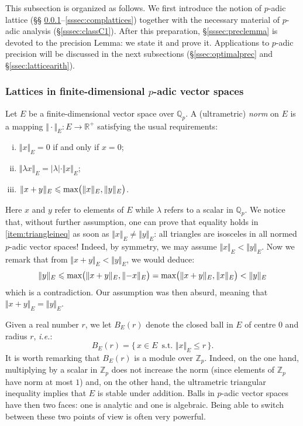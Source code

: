 \documentclass[11pt]{article}
\numberwithin{equation}{section}
\numberwithin{figure}{section}
\renewcommand{\leq}{\leqslant}
\theoremstyle{definition}
\newcommand{\Z}{\mathbb Z}
\newcommand{\Zp}{\Z_p}
\newcommand{\Q}{\mathbb Q}
\newcommand{\Qp}{\Q_p}
\newcommand{\R}{\mathbb R}
\renewcommand{\max}{\text{\rm max}}
\begin{document}
This subsection is organized as follows. We first introduce the notion 
of $p$-adic lattice (\S\S 
\ref{sssec:lattices}--\ref{sssec:complattices}) together with the 
necessary material of $p$-adic analysis (\S \ref{sssec:classC1}). After 
this preparation, \S \ref{sssec:preclemma} is devoted to the precision 
Lemma: we state it and prove it. Applications to $p$-adic precision 
will be discussed in the next subsections (\S \ref{ssec:optimalprec}
and \S \ref{ssec:latticearith}).

\subsubsection{Lattices in finite-dimensional $p$-adic vector spaces}
\label{sssec:lattices}

Let $E$ be a finite-dimensional vector space over $\Qp$.
A (ultrametric) \emph{norm} on $E$ is a mapping $\Vert \cdot \Vert_E :
E \to \R^+$ satisfying the usual requirements:
\begin{enumerate}[(i)]
\renewcommand{\itemsep}{0pt}
\item $\Vert x \Vert_E = 0$ if and only if $x = 0$;
\item $\Vert \lambda x \Vert_E = |\lambda| \cdot \Vert x \Vert_E$;
\item \label{item:triangleineq}
$\Vert x + y \Vert_E \leq \max\big( \Vert x \Vert_E, 
\Vert y \Vert_E \big)$.
\end{enumerate}
Here $x$ and $y$ refer to elements of $E$ while $\lambda$ refers
to a scalar in $\Qp$. We notice that, without further assumption, 
one can prove that equality holds in \eqref{item:triangleineq} as
soon as $\Vert x \Vert_E \neq \Vert y \Vert_E$: all triangles are 
isosceles in all normed $p$-adic vector spaces! Indeed, by symmetry, we 
may assume $\Vert x \Vert_E < \Vert y \Vert_E$. Now we remark that from 
$\Vert x + y \Vert_E < \Vert y \Vert_E$, we would deduce:
$$\Vert y \Vert_E 
  \leq \max\big(\Vert x+y\Vert_E, \Vert {-}x \Vert_E\big) 
  = \max\big(\Vert x+y\Vert_E, \Vert x \Vert_E\big) 
  < \Vert y \Vert_E$$
which is a contradiction. Our assumption was then absurd, meaning that 
$\Vert x + y \Vert_E = \Vert y \Vert_E$.

Given a real number $r$, we let $B_E(r)$ denote the closed ball in $E$ 
of centre $0$ and radius $r$, \emph{i.e.}:
$$B_E(r) = \big\{\, x \in E \,\text{ s.t. } \Vert x \Vert_E \leq r 
\,\big\}.$$
It is worth remarking that $B_E(r)$ is a module over $\Zp$. Indeed,
on the one hand, multiplying by a scalar in $\Zp$ does not increase
the norm (since elements of $\Zp$ have norm at most $1$) and, on the 
other hand, the ultrametric triangular inequality implies that $E$ is 
stable under addition. Balls in $p$-adic vector spaces have then two
faces: one is analytic and one is algebraic.
Being able to switch between these two points of view is often very
powerful.
\end{document}
